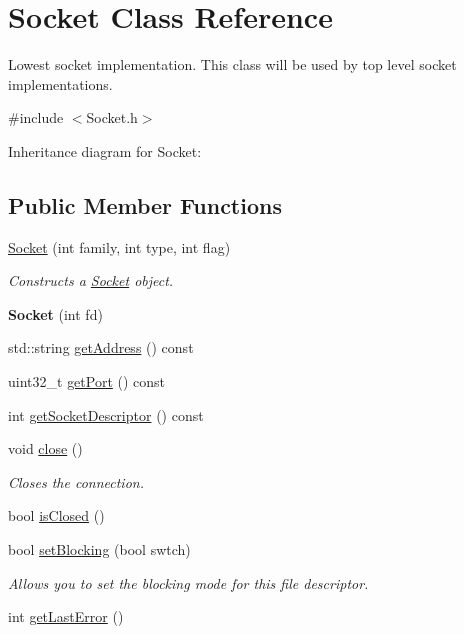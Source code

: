 \hypertarget{classSocket}{}\section{Socket Class Reference}
\label{classSocket}


Lowest socket implementation. This class will be used by top level socket implementations.  




{\ttfamily \#include $<$Socket.\+h$>$}



Inheritance diagram for Socket\+:
\subsection*{Public Member Functions}
\begin{DoxyCompactItemize}
\item 
\hyperlink{classSocket_aa2d2ef4b12252e237f8e8d47c8000a8e}{Socket} (int family, int type, int flag)
\begin{DoxyCompactList}\small\item\em Constructs a \hyperlink{classSocket}{Socket} object. \end{DoxyCompactList}\item 
\mbox{\label{classSocket_a5390f8264f7872c9a8e695e01184e929}} 
{\bfseries Socket} (int fd)
\item 
std\+::string \hyperlink{classSocket_ab8ba548a41bbbccb9eef1ae22c4d799c}{get\+Address} () const
\item 
uint32\+\_\+t \hyperlink{classSocket_a3d48dfb424a9853ad2bcb5a7664f76c0}{get\+Port} () const
\item 
int \hyperlink{classSocket_afd21401fa7f8ff6ad4e3083142bb9ade}{get\+Socket\+Descriptor} () const
\item 
\mbox{\label{classSocket_a75ee749264ccbcfc4dfbf5442e55dcb8}} 
void \hyperlink{classSocket_a75ee749264ccbcfc4dfbf5442e55dcb8}{close} ()
\begin{DoxyCompactList}\small\item\em Closes the connection. \end{DoxyCompactList}\item 
bool \hyperlink{classSocket_a7e54aa5a8807a44096258b41fd27ecf3}{is\+Closed} ()
\item 
bool \hyperlink{classSocket_a14aeb614f43be5dccd69c7bec6a0e1e8}{set\+Blocking} (bool swtch)
\begin{DoxyCompactList}\small\item\em Allows you to set the blocking mode for this file descriptor. \end{DoxyCompactList}\item 
int \hyperlink{classSocket_af46a74a554fbc2ce08446eaa8d3dda37}{get\+Last\+Error} ()
\end{DoxyCompactItemize}
